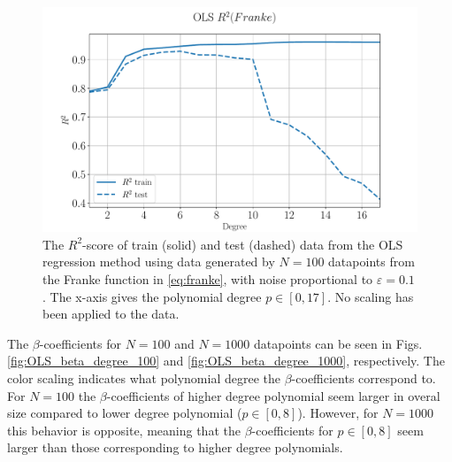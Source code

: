 \documentclass[%
reprint,
amsmath,amssymb,
aps,
pra,
]{revtex4-2}
\begin{document}
\begin{figure}[ht!]
	\centering
	\includegraphics[width=\linewidth]{Python/Figures/OLS/OLS_R2_no_scaling.pdf}
	\caption{The \(R^2\)-score of train (solid) and test (dashed) data from the OLS regression method using data generated by \(N=100\) datapoints from the Franke function in \eqref{eq:franke}, with noise proportional to \(\varepsilon=0.1\). The x-axis gives the polynomial degree \(p\in[0,17]\). No scaling has been applied to the data.}
	\label{fig:OLS_r2_degree}
\end{figure}

The \(\beta\)-coefficients for \(N=100\) and \(N=1000\) datapoints can be seen in Figs. \ref{fig:OLS_beta_degree_100} and \ref{fig:OLS_beta_degree_1000}, respectively. The color scaling indicates what polynomial degree the \(\beta\)-coefficients correspond to. For \(N=100\) the \(\beta\)-coefficients of higher degree polynomial seem larger in overal size compared to lower degree polynomial (\(p\in[0,8]\)). However, for \(N=1000\) this behavior is opposite, meaning that the \(\beta\)-coefficients for \(p\in[0,8]\) seem larger than those corresponding to higher degree polynomials.
\end{document}
